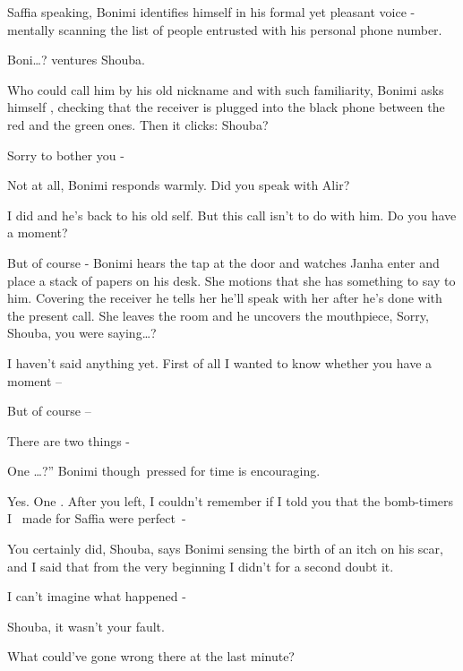 \documentclass[12pt]{book}
\begin{document}
{\textquotedbl}Saffia speaking,{\textquotedbl} Bonimi identifies himself in his formal yet pleasant voice - mentally
scanning the list of people entrusted with his personal phone number.

{\textquotedbl}Boni{\dots}?{\textquotedbl} ventures Shouba.

Who could call him by his old nickname and with such familiarity, Bonimi asks himself , checking that the receiver is
plugged into the black phone between the red and the green ones. Then it clicks: {\textquotedbl}Shouba?{\textquotedbl}

{\textquotedbl}Sorry to bother you -{\textquotedbl}

{\textquotedbl}Not at all,{\textquotedbl} Bonimi responds warmly. {\textquotedbl}Did you speak with Alir?{\textquotedbl}

{\textquotedbl}I did and he's back to his old self. But this call isn't to do with him. Do you have a
moment?{\textquotedbl}

{\textquotedbl}But of course -{\textquotedbl} Bonimi hears the tap at the door and watches Janha enter and place a stack
of papers on his desk. She motions that she has something to say to him. Covering the receiver he tells her he'll speak
with her after he's done with the present call. She leaves the room and he uncovers the mouthpiece,
{\textquotedbl}Sorry, Shouba, you were saying{\dots}?{\textquotedbl}

{\textquotedbl}I haven't said anything yet. First of all I wanted to know whether you have a moment --{\textquotedbl}

{\textquotedbl}But of course --{\textquotedbl}

{\textquotedbl}There are two things -{\textquotedbl}

{\textquotedbl}One {\dots}?'' Bonimi though~pressed for time is encouraging.

{\textquotedbl}Yes. One . After you left, I couldn't remember if I told you that the bomb-timers I \ made for Saffia
were perfect~-{\textquotedbl}

{\textquotedbl}You certainly did, Shouba,{\textquotedbl} says Bonimi sensing the birth of an itch on his scar,
{\textquotedbl}and I said that from the very beginning I didn't for a second doubt it.{\textquotedbl}

{\textquotedbl}I can't imagine what happened -{\textquotedbl}

{\textquotedbl}Shouba, it wasn't your fault.{\textquotedbl}

{\textquotedbl}What could've gone wrong there at the last minute?{\textquotedbl}
\end{document}
